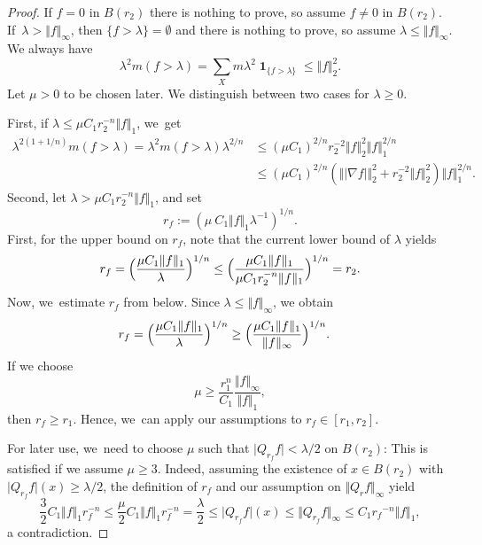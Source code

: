 \documentclass[10pt]{amsart}
\theoremstyle{plain}
\theoremstyle{definition}
\DeclareMathOperator{\Eins}{\mathbf{1}}
\begin{document}
\begin{proof}If $f=0$ in $B(r_2)$ there is nothing to prove, so assume $f\neq 0$ in $B(r_2)$. If~$\lambda>\Vert f\Vert_\infty$, then $\{f>\lambda\}=\emptyset$ and there is nothing to prove, so assume $\lambda \leq \Vert f\Vert_\infty$. We always have
\[
\lambda^2 m(f>\lambda)=\sum_X m \lambda^2\Eins_{\{f>\lambda\}}\leq \Vert f\Vert_2^2.
\]
Let $\mu>0$ to be chosen later. We distinguish between two cases for $\lambda\geq 0$.

First, if $\lambda\leq \mu C_1 r_2^{-n}\Vert f\Vert_1$, we~get
\begin{align*}
\lambda^{2(1+1/n)}m(f>\lambda)=\lambda^2m(f>\lambda)\lambda^{2/n}&\leq (\mu C_1)^{2/n} r_2^{-2}\Vert f\Vert_2^2\Vert f\Vert_1^{2/n}
\\
&\leq (\mu C_1)^{2/n}\left( \Vert|\nabla f|\Vert_2^2+r_2^{-2}\Vert f\Vert_2^2\right)\Vert f\Vert_1^{2/n}.
\end{align*}
Second, let $\lambda> \mu C_1 r_2^{-n}\Vert f\Vert_1$, and set
\[
r_f:=(\mu\ C_1\Vert f\Vert_1\lambda^{-1})^{1/n}.
\]
First, for the upper bound on $r_f$, note that the current lower bound of $\lambda$ yields
\[
r_f=
\Bigl(\frac{\mu C_1\Vert f\Vert_1}{\lambda}\Bigr)^{1/n}
\leq
\Bigl(\frac{\mu C_1\Vert f\Vert_1}{\mu C_1 r_2^{-n}\Vert f\Vert_1}\Bigr)^{1/n}=r_2.
\]
Now, we~estimate $r_f$ from below.
Since
$\lambda\leq\Vert f\Vert_\infty$,
we obtain
\begin{align*}
r_f
=
\Bigl(\frac{\mu C_1\Vert f\Vert_1}{\lambda}\Bigr)^{1/n}
&\geq
\Bigl(\frac{\mu C_1\Vert f\Vert_1}{\Vert f\Vert_\infty}\Bigr)^{1/n}.
\end{align*}
If we choose
\[
\mu
\geq \frac{r_1^n}{C_1} \frac{\Vert f\Vert_\infty}{\Vert f\Vert_1},
\]
then
$r_f\geq r_1$.
Hence, we~can apply our assumptions to $r_f\in[ r_1,r_2]$.

For later use, we~need to choose $\mu$ such that $\vert Q_{r_f} f\vert <\lambda/2$ on $B(r_2)$: This is satisfied if we assume $\mu\geq 3$. Indeed, assuming the existence of $x\in B(r_2)$ with $\vert Q_{r_f} f\vert(x) \geq \lambda/2$, the definition of $r_f$ and our assumption on $\Vert Q_{r}f\Vert_\infty$ yield
\[
\frac{3}{2}C_1\Vert f\Vert_1 r_f^{-n}
\leq \frac{\mu}{2}C_1\Vert f\Vert_1 r_f^{-n}=\frac{\lambda}{2}\leq\vert Q_{r_f}f\vert(x)\leq \Vert Q_{r_f}f\Vert_\infty\leq C_1{r_f}^{-n}\Vert f\Vert_1,
\]
a contradiction.


\end{proof}
\end{document}
